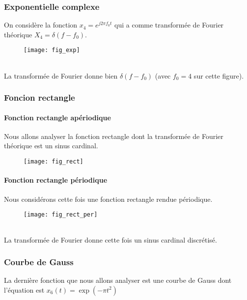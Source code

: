 \documentclass{article}
\begin{document}
\subsubsection{Exponentielle complexe}
On considère la fonction $x_4=e^{j2\pi f_0 t}$ qui a comme transformée de Fourier théorique $X_4=\delta(f-f_0)$.
\begin{figure}[h]
\texttt{[image: fig\_exp]}
\centering
\end{figure} \\
La transformée de Fourier donne bien $\delta(f-f_0)$ (avec $f_0=4$ sur cette figure).

\subsubsection{Foncion rectangle}
\paragraph{Fonction rectangle apériodique}
Nous allons analyser la fonction rectangle dont la transformée de Fourier théorique est un sinus cardinal.
\begin{figure}[h]
\texttt{[image: fig\_rect]}
\centering
\end{figure}
\paragraph{Fonction rectangle périodique}
Nous considérons cette fois une fonction rectangle rendue périodique.
\begin{figure}[h]
\texttt{[image: fig\_rect\_per]}
\centering
\end{figure} \\
La transformée de Fourier donne cette fois un sinus cardinal discrétisé.
\subsubsection{Courbe de Gauss}
La dernière fonction que nous allons analyser est une courbe de Gauss dont l'équation est $x_6(t)=\exp(-\pi t^2)$
\end{document}
